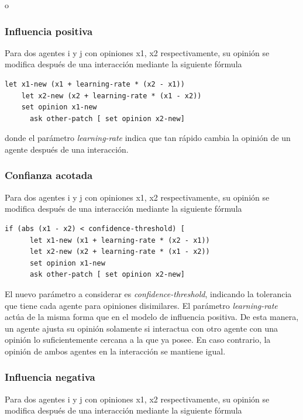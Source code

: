 o \documentclass[11pt, letterpaper]{article}
\begin{document}
\subsubsection{Influencia positiva}\label{influencia-positiva}

Para dos agentes i y j con opiniones x1, x2 respectivamente, su opinión
se modifica después de una interacción mediante la siguiente fórmula

\begin{verbatim}
let x1-new (x1 + learning-rate * (x2 - x1))
    let x2-new (x2 + learning-rate * (x1 - x2))
    set opinion x1-new
      ask other-patch [ set opinion x2-new] 
\end{verbatim}

donde el parámetro \emph{learning-rate} indica que tan rápido cambia la
opinión de un agente después de una interacción.

\subsubsection{Confianza acotada}\label{confianza-acotada}

Para dos agentes i y j con opiniones x1, x2 respectivamente, su opinión
se modifica después de una interacción mediante la siguiente fórmula

\begin{verbatim}
if (abs (x1 - x2) < confidence-threshold) [ 
      let x1-new (x1 + learning-rate * (x2 - x1))
      let x2-new (x2 + learning-rate * (x1 - x2))
      set opinion x1-new
      ask other-patch [ set opinion x2-new]
\end{verbatim}

El nuevo parámetro a considerar es \emph{confidence-threshold},
indicando la tolerancia que tiene cada agente para opiniones
disimilares. El parámetro \emph{learning-rate} actúa de la misma forma
que en el modelo de influencia positiva. De esta manera, un agente
ajusta su opinión solamente si interactua con otro agente con una
opinión lo suficientemente cercana a la que ya posee. En caso contrario,
la opinión de ambos agentes en la interacción se mantiene igual.

\subsubsection{Influencia negativa}\label{influencia-negativa}

Para dos agentes i y j con opiniones x1, x2 respectivamente, su opinión
se modifica después de una interacción mediante la siguiente fórmula
\end{document}

